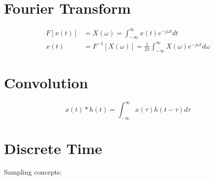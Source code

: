 
\section{Fourier Transform}
\begin{align*}
F\left[x(t)\right] &= X(\omega) = \int_{-\infty}^{\infty}x(t)e^{-j\omega t}dt \\
x(t) &= F^{-1}\left[X(\omega)\right] = \frac{1}{2\pi}\int_{-\infty}^{\infty}X(\omega)e^{-j\omega t}d\omega
\end{align*}

\section{Convolution}
\[x(t) * h(t) = \int_{-\infty}^{\infty}x(\tau)h(t-\tau)d\tau\]

\section{Discrete Time}
Sampling concepts:


